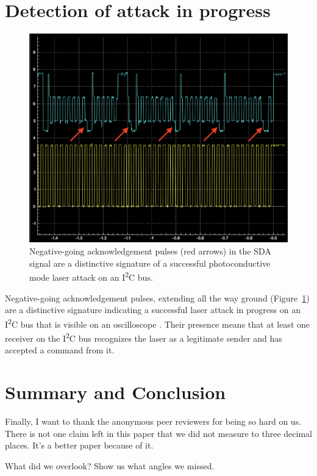 \documentclass[letterpaper]{article}
\newcommand{\squared}{\textsuperscript{2}}
\begin{document}
\section{Detection of attack in progress}
\begin{figure}[ht]
  \centering
  \includegraphics[width=\linewidth]{graphics/signature_of_the_attack.png}
  \caption{Negative-going acknowledgement pulses (red arrows) in the SDA signal
    are a distinctive signature of a successful photoconductive mode laser
    attack on an I\squared C bus.}
  \label{figure:attack_signature}
\end{figure}
Negative-going acknowledgement pulses, extending all the way ground
(Figure~\ref{figure:attack_signature}) are a distinctive signature indicating a
successful laser attack in progress on an I\squared C bus that is visible on an
oscilloscope \cite{Loughry2024c}. Their presence means that at least one
receiver on the I\squared C bus recognizes the laser as a legitimate sender and
has accepted a command from it.
\section{Summary and Conclusion}
Finally, I want to thank the anonymous peer reviewers for being so hard on us.
There is not one claim left in this paper that we did not measure to three
decimal places. It's a better paper because of it.

What did we overlook? Show us what angles we missed.


\end{document}
